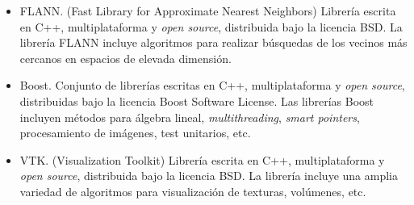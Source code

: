 \begin{itemize}
\item FLANN. (Fast Library for Approximate Nearest Neighbors) Librería escrita en C++, multiplataforma y \textit{open source}, distribuida bajo la licencia BSD. La librería FLANN incluye algoritmos para realizar búsquedas de los vecinos más cercanos en espacios de elevada dimensión.

\item Boost. Conjunto de librerías escritas en C++, multiplataforma y \textit{open source}, distribuidas bajo la licencia Boost Software License. Las librerías Boost incluyen métodos para álgebra lineal, \textit{multithreading}, \textit{smart pointers}, procesamiento de imágenes, test unitarios, etc.

\item VTK. (Visualization Toolkit) Librería escrita en C++, multiplataforma y \textit{open source}, distribuida bajo la licencia BSD. La librería incluye una amplia variedad de algoritmos para visualización de texturas, volúmenes, etc.

\end{itemize}

